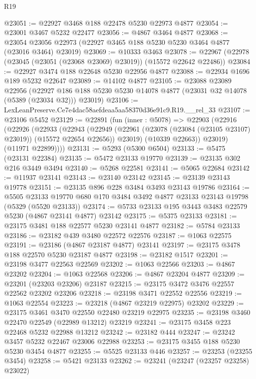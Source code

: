 \begin{lexlean}{R19}
\begin{coremodule}
@23051 := @22927 @3468 @188 @22478 @5230 @22973 @4877
@23054 := @23001 @3467 @5232 @22477
@23056 := @4867 @3464 @4877
@23068 := @23054 @23056 @22973 (@22927 @3465 @188 @5230 @5230 @3464 @4877 (@23016 @3464) @23019)
@23069 := @10333 @3463
@23078 := @22967 (@22978 (@23045 (@23051 (@23068 @23069) @23019)) (@15572 @22642 @22486))
@23084 := @22927 @3474 @188 @22648 @5230 @22956 @4877
@23088 := @22934 @1696 @189 @5232 @22647
@23089 := @14102 @4877
@23105 := @23088
    @23089
    @22956
    (@22927 @186 @188 @5230 @5230 @14078 @4877 (@23031 @32 @14078 (@5389 (@23034 @32))) @23019)
@23106 := LexLeanPreserve.Ce7e4dac58aefdeaa5aa58370d36e91c9.R19.__rel_33
@23107 := @23106 @5452
@23129 := @22891
    (fun (inner : @5078) =>
    @22903
      (@22916
        (@22926
          (@22933
            (@22943
              (@22949
                (@22961 (@23078 (@23084 (@23105 @23107) @23019)) (@15572 @22654 @22656))
                @23019)
              (@10339 @22663))
            @23019)
          (@11971 @22899))))
@23131 := @5293 (@5300 @6504)
@23133 := @5475 (@23131 @22384)
@23135 := @5472 @23133 @19770
@23139 := @23135 @302 @216 @3449 @3494
@23140 := @5268 @22581
@23141 := @5065 @22684
@23142 := @11937 @23141
@23143 := @23140 @23142
@23145 := @23139 @23143 @19778
@23151 := @23135 @896 @228 @3484 @3493 @23143 @19786
@23164 := @5505
    @23133
    @19770
    @680
    @170
    @3484
    @3492
    @4877
    @23133
    @23143
    @19798
    (@5329 (@5520 @23133))
@23174 := @5733 @23133 @195 @3443 @3483 @22579 @5230 (@4867 @23141 @4877) @23142
@23175 := @5375 @23133
@23181 := @23175 @3481 @188 @22577 @5230 @23141 @4877
@23182 := @5784 @23133
@23186 := @23182 @439 @3480 @22572 @22576
@23187 := @1063 @22575
@23191 := @23186 (@4867 @23187 @4877) @23141
@23197 := @23175 @3478 @188 @22570 @5230 @23187 @4877
@23198 := @23182 @1517
@23201 := @23198 @3477 @22563 @22569
@23202 := @1063 @22566
@23203 := @4867 @23202
@23204 := @1063 @22568
@23206 := @4867 @23204 @4877
@23209 := @23201 (@23203 @23206) @23187
@23215 := @23175 @3472 @3476 @22557 @22562 @23202 @23206
@23218 := @23198 @3471 @22552 @22556
@23219 := @1063 @22554
@23223 := @23218 (@4867 @23219 @22975) @23202
@23229 := @23175 @3461 @3470 @22550 @22480 @23219 @22975
@23235 := @23198 @3460 @22470 @22549 (@22989 @13212) @23219
@23241 := @23175 @3458 @223 @22468 @5232 @22988 @13212
@23242 := @23182 @444
@23247 := @23242 @3457 @5232 @22467 @23006 @22988
@23253 := @23175 @3455 @188 @5230 @5230 @3454 @4877
@23255 := @5525 @23133 @446
@23257 := @23253 (@23255 @3454)
@23258 := @5421 @23133
@23262 := @23241 (@23247 (@23257 @23258) @23022)

\end{coremodule}
\end{lexlean}
